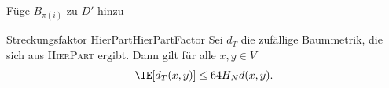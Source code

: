 \documentclass[language=ngerman,algolist]{TemplateLecture}
\begin{document}
\begin{algorithm}[h]
    \caption{\textsc{Partition}}\label{alg:partition}
    \begin{algorithmic}[1]
                 Füge $B_{\pi(i)}$ zu $D'$ hinzu \EndIf{}
            \EndFor{}
        \EndFor{}
    \end{algorithmic}
\end{algorithm}


\begin{lem}{Streckungsfaktor HierPart}{HierPartFactor}
    Sei $d_T$ die zufällige Baummetrik, die sich aus \textsc{HierPart} ergibt. Dann gilt für alle $x,y \in V$
    \begin{equation*}
        \IE[d_T(x,y)] \leq 64 H_N d(x,y).
    \end{equation*}
\end{lem}
\end{document}
